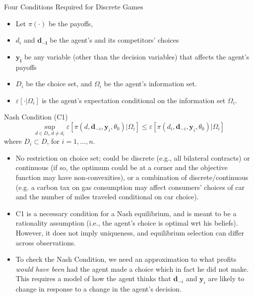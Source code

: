 \begin{frame}{Four Conditions Required for Discrete Games}
\begin{itemize}
\item Let $\pi(\cdot)$ be the payoffs, 
\item $d_i$ and $\symbf{d_{-i}}$ be the agent's and its competitors' choices
\item $\symbf{y_i}$ be any variable (other than the decision variables) that affects the agent's payoffs
\item $D_i$ be the choice set, and $\Omega_i$ be the agent's information set.  
\item \large{$\varepsilon[ \cdot | \Omega_i]$} \normalsize is the agent's expectation conditional on the information set $\Omega_i$.
\end{itemize}
\end{frame}


\begin{frame}{Nash Condition (C1)}
\begin{equation*}
\sup_{d\in D_{i},d\neq d_{i}}\varepsilon\left[ \pi (d,\symbf{d}_{-i},\symbf{y}_{i},\theta _{0})|\Omega_i \right] \leq \varepsilon\left[ \pi (d_{i},\symbf{d}_{-i},\symbf{y}_{i},\theta _{0})| \Omega_i \right] 
\end{equation*}
where $D_{i}\subset D$, for $i=1,...,n$.
\begin{itemize}
\footnotesize
\item No restriction on choice set; could be discrete (e.g., all bilateral
contracts) or continuous (if so, the optimum could be at a corner and the objective function may
have non-convexities), or a combination of discrete/continuous (e.g. a carbon tax on gas consumption may affect consumers' choices of car and the number of miles
traveled conditional on car choice).
\item C1 is a necessary condition for a Nash equilibrium, and is meant to be a rationality assumption (i.e., the agent's choice is optimal wrt his beliefs).  However, it does not imply uniqueness, and equilibrium selection can differ across observations.
\item To check the Nash Condition, we need an approximation to what profits \textit{%
would have been} had the agent made a choice which in fact he did not make.
This requires a model of how the agent thinks that $\symbf{d}_{-i}$ and $%
\symbf{y}_{i}$ are likely to change in response to a change in the agent's
decision. 
\end{itemize}
\end{frame}

